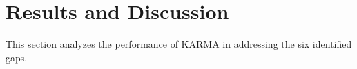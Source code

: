 \documentclass[conference]{IEEEtran}
\makeatletter
\renewcommand\paragraph{\@startsection{paragraph}{5}{\z@}%
  {3.25ex \@plus1ex \@minus.2ex}%
  {-1em}%
  {\normalfont\normalsize\bfseries}}
\makeatother
\begin{document}




\section{Results and Discussion}
\label{sec:results}

This section analyzes the performance of KARMA in addressing the six identified gaps.
\end{document}
